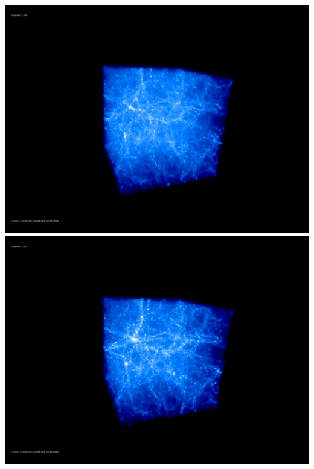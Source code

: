 \includegraphics[scale=0.1]{r256/h100/stages_51/50.jpg} 
\includegraphics[scale=0.1]{r256/h100/stages_51/100.jpg}  \\

